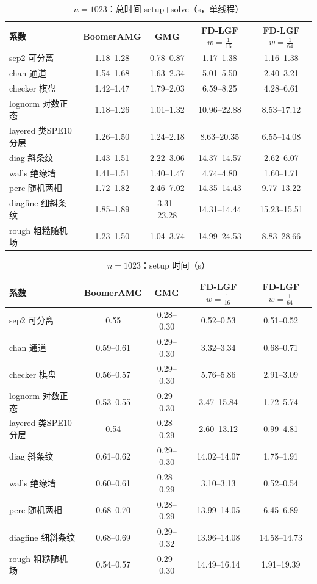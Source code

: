 \begin{table}[H]\centering\small
\caption{$n=1023$：总时间 setup+solve（s，单线程）}\label{tab:time}
\begin{tabular}{lcccc}
\toprule
系数 & BoomerAMG & GMG & FD-LGF $w{=}\frac1{16}$ & FD-LGF $w{=}\frac1{64}$ \\
\midrule
sep2 可分离 & 1.18--1.28 & 0.78--0.87 & 1.17--1.38 & 1.16--1.38 \\
chan 通道 & 1.54--1.68 & 1.63--2.34 & 5.01--5.50 & 2.40--3.21 \\
checker 棋盘 & 1.42--1.47 & 1.79--2.03 & 6.59--8.25 & 4.28--6.61 \\
lognorm 对数正态 & 1.18--1.26 & 1.01--1.32 & 10.96--22.88 & 8.53--17.12 \\
layered 类SPE10分层 & 1.26--1.50 & 1.24--2.18 & 8.63--20.35 & 6.55--14.08 \\
diag 斜条纹 & 1.43--1.51 & 2.22--3.06 & 14.37--14.57 & 2.62--6.07 \\
walls 绝缘墙 & 1.41--1.51 & 1.40--1.47 & 4.74--4.80 & 1.60--1.71 \\
perc 随机两相 & 1.72--1.82 & 2.46--7.02 & 14.35--14.43 & 9.77--13.22 \\
diagfine 细斜条纹 & 1.85--1.89 & 3.31--23.28 & 14.31--14.44 & 15.23--15.51 \\
rough 粗糙随机场 & 1.23--1.50 & 1.04--3.74 & 14.99--24.53 & 8.83--28.66 \\
\bottomrule
\end{tabular}
\end{table}

\begin{table}[H]\centering\small
\caption{$n=1023$：setup 时间（s）}\label{tab:setup}
\begin{tabular}{lcccc}
\toprule
系数 & BoomerAMG & GMG & FD-LGF $w{=}\frac1{16}$ & FD-LGF $w{=}\frac1{64}$ \\
\midrule
sep2 可分离 & 0.55 & 0.28--0.30 & 0.52--0.53 & 0.51--0.52 \\
chan 通道 & 0.59--0.61 & 0.29--0.30 & 3.32--3.34 & 0.68--0.71 \\
checker 棋盘 & 0.56--0.57 & 0.29--0.30 & 5.76--5.86 & 2.91--3.09 \\
lognorm 对数正态 & 0.53--0.55 & 0.29--0.30 & 3.47--15.84 & 1.72--5.74 \\
layered 类SPE10分层 & 0.54 & 0.28--0.29 & 2.60--13.12 & 0.99--4.81 \\
diag 斜条纹 & 0.61--0.62 & 0.29--0.30 & 14.02--14.07 & 1.75--1.91 \\
walls 绝缘墙 & 0.60--0.61 & 0.28--0.29 & 3.10--3.13 & 0.52--0.54 \\
perc 随机两相 & 0.68--0.70 & 0.28--0.29 & 13.99--14.05 & 6.45--6.89 \\
diagfine 细斜条纹 & 0.68--0.69 & 0.29--0.32 & 13.96--14.08 & 14.58--14.73 \\
rough 粗糙随机场 & 0.54--0.57 & 0.29--0.30 & 14.49--16.14 & 1.91--19.39 \\
\bottomrule
\end{tabular}
\end{table}

